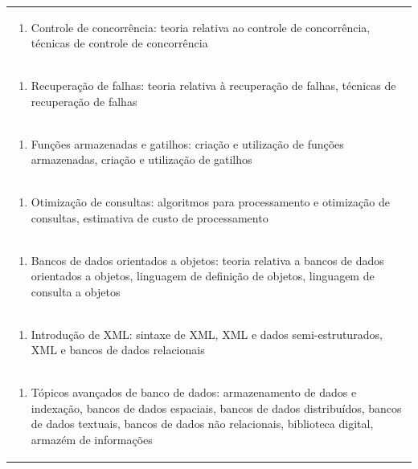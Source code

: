 \documentclass[11pt]{article}
\begin{document}
\begin{center}
\begin{longtable}{|p{4cm}|p{4cm}|p{4cm}|p{4cm}|}
\multicolumn{4}{|p{\dimexpr 16cm + 6\tabcolsep\relax}|}{\begin{enumerate}[start=2]\item Controle de concorrência: teoria relativa ao controle de concorrência, técnicas de controle de concorrência\end{enumerate}}\\
\multicolumn{4}{|p{\dimexpr 16cm + 6\tabcolsep\relax}|}{\begin{enumerate}[start=3]\item Recuperação de falhas: teoria relativa à recuperação de falhas, técnicas de recuperação de falhas\end{enumerate}}\\
\multicolumn{4}{|p{\dimexpr 16cm + 6\tabcolsep\relax}|}{\begin{enumerate}[start=4]\item Funções armazenadas e gatilhos: criação e utilização de funções armazenadas, criação e utilização de gatilhos\end{enumerate}}\\
\multicolumn{4}{|p{\dimexpr 16cm + 6\tabcolsep\relax}|}{\begin{enumerate}[start=5]\item Otimização de consultas: algoritmos para processamento e otimização de consultas, estimativa de custo de processamento\end{enumerate}}\\
\multicolumn{4}{|p{\dimexpr 16cm + 6\tabcolsep\relax}|}{\begin{enumerate}[start=6]\item Bancos de dados orientados a objetos: teoria relativa a bancos de dados orientados a objetos, linguagem de definição de objetos, linguagem de consulta a objetos\end{enumerate}}\\
\multicolumn{4}{|p{\dimexpr 16cm + 6\tabcolsep\relax}|}{\begin{enumerate}[start=7]\item Introdução de XML: sintaxe de XML, XML e dados semi-estruturados, XML e bancos de dados relacionais\end{enumerate}}\\
\multicolumn{4}{|p{\dimexpr 16cm + 6\tabcolsep\relax}|}{\begin{enumerate}[start=8]\item Tópicos avançados de banco de dados: armazenamento de dados e indexação, bancos de dados espaciais, bancos de dados distribuídos, bancos de dados textuais, bancos de dados não relacionais, biblioteca digital, armazém de informações\end{enumerate}}\\

\end{longtable}
\end{center}
\end{document}
